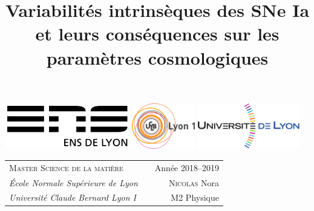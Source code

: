 \documentclass[a4paper, 12pt, svgnames]{article}
\title{Variabilités intrinsèques des SNe Ia et leurs conséquences sur les
paramètres cosmologiques}
\begin{document}
\thispagestyle{empty}
\noindent\includegraphics[height=2cm]{General_figures/logoens.png} \hfill
\includegraphics[height=2cm]{General_figures/logoucbl.png} \hfill
\includegraphics[height=2cm]{General_figures/logounivlyon.png}\vfill

\noindent\begin{tabularx}{\linewidth+27pt}{@{} l X r @{} }
{\textsc{Master Science de la matière}} & & Année 2018--2019\hspace*{1cm}\\
{\textit{École Normale Supérieure de Lyon}} & & \textsc{Nicolas} Nora\hspace*{1cm}\\
{\textit{Université Claude Bernard Lyon I}} & & M2 Physique\hspace*{1cm}
\end{tabularx}
\end{document}
